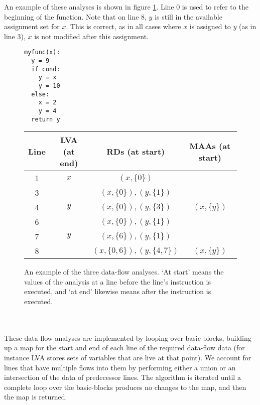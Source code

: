 An example of these analyses is shown in figure \ref{fig:dataflow}. Line 0 is used to refer to the beginning of the function. Note that on line 8, $y$ is still in the available assignment set for $x$. This is correct, as in all cases where $x$ is assigned to $y$ (as in line 3), $x$ is not modified after this assignment.
\begin{figure}[h]
\begin{minipage}{0.25\linewidth}
\begin{verbatim}
myfunc(x):
  y = 9
  if cond:
    y = x
    y = 10
  else:
    x = 2
    y = 4
  return y
\end{verbatim}
\end{minipage}
\begin{minipage}{0.75\linewidth}
\begin{center}
    \begin{tabular}{|c|c|c|c|}
        \hline
        Line & LVA (at end) & RDs (at start) & MAAs (at start) \\
        \hline
        1 & $x$ & $(x, \{0\})$ & \\
        \hline
        3 & & $(x, \{0\}), (y, \{1\})$ & \\
        4 & $y$ & $(x, \{0\}), (y, \{3\})$ & $(x, \{y\})$ \\
        \hline
        6 & & $(x, \{0\}), (y, \{1\})$ & \\
        7 & $y$ & $(x, \{6\}), (y, \{1\})$ & \\
        \hline
        8 & & $(x, \{0, 6\}), (y, \{4, 7\})$ & $(x, \{y\})$ \\
        \hline
    \end{tabular}
\end{center}
\end{minipage}
\caption{An example of the three data-flow analyses. `At start' means the values of the analysis at a line before the line's instruction is executed, and `at end' likewise means after the instruction is executed.}
\label{fig:dataflow}
\end{figure}
\\\\
These data-flow analyses are implemented by looping over basic-blocks, building up a map for the start and end of each line of the required data-flow data (for instance LVA stores sets of variables that are live at that point). We account for lines that have multiple flows into them by performing either a union or an intersection of the data of predecessor lines. The algorithm is iterated until a complete loop over the basic-blocks produces no changes to the map, and then the map is returned.

